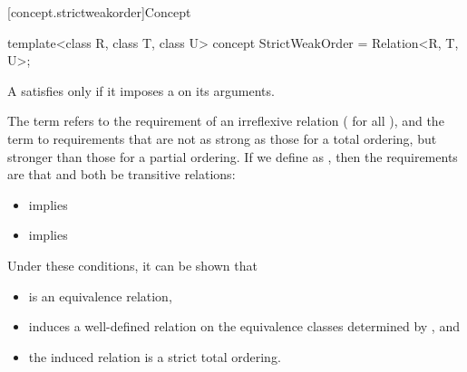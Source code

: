[concept.strictweakorder]{Concept }

%
\begin{itemdecl}
template<class R, class T, class U>
  concept StrictWeakOrder = Relation<R, T, U>;
\end{itemdecl}

\begin{itemdescr}
\pnum
A  satisfies  only if
it imposes a  on its arguments.

\pnum
The term
refers to the
requirement of an irreflexive relation ( for all ),
and the term
to requirements that are not as strong as
those for a total ordering,
but stronger than those for a partial
ordering.
If we define
as
,
then the requirements are that
and
both be transitive relations:

\begin{itemize}
\item
{}
implies
\item
{}
implies
\end{itemize}

\pnum
\begin{note}
Under these conditions, it can be shown that
\begin{itemize}
\item
{}
is an equivalence relation,
\item
{}
induces a well-defined relation on the equivalence
classes determined by
, and
\item
the induced relation is a strict total ordering.
\end{itemize}
\end{note}
\end{itemdescr}
